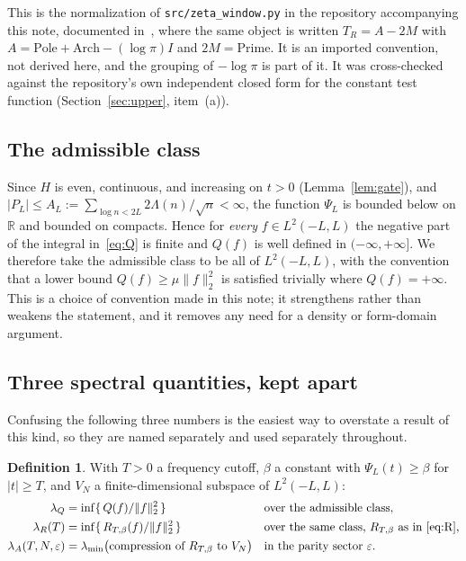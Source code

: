 \documentclass[11pt,a4paper]{article}
\theoremstyle{definition}
\newtheorem{definition}[theorem]{Definition}
\theoremstyle{remark}
\newcommand{\lQ}{\lambda_{Q}}
\newcommand{\lR}{\lambda_{R}}
\newcommand{\lA}{\lambda_{A}}
\newcommand{\PsiL}{\Psi_{L}}
\newcommand{\src}[1]{{\footnotesize\texttt{#1}}}
\begin{document}
This is the normalization of \src{src/zeta\_window.py} in the repository
accompanying this note, documented in~\cite{Sensitivity}, where the same object
is written $T_R = A - 2M$ with $A = \mathrm{Pole} + \mathrm{Arch} - (\log\pi)I$
and $2M = \mathrm{Prime}$. It is an imported convention, not derived here, and
the grouping of $-\log\pi$ is part of it. It was cross-checked against the repository's own
independent closed form for the constant test function
(Section~\ref{sec:upper}, item~(a)).

\subsection{The admissible class}

Since $H$ is even, continuous, and increasing on $t > 0$
(Lemma~\ref{lem:gate}), and $|P_L| \le A_L := \sum_{\log n < 2L}
2\Lambda(n)/\sqrt n < \infty$, the function $\PsiL$ is bounded below on
$\mathbb{R}$ and bounded on compacts. Hence for \emph{every} $f \in L^2(-L,L)$
the negative part of the integral in~\eqref{eq:Q} is finite and $Q(f)$ is
well defined in $(-\infty,+\infty]$. We therefore take the admissible class to
be all of $L^2(-L,L)$, with the convention that a lower bound
$Q(f) \ge \mu\|f\|_2^2$ is satisfied trivially where $Q(f) = +\infty$. This is a
choice of convention made in this note; it strengthens rather than weakens the
statement, and it removes any need for a density or form-domain argument.

\subsection{Three spectral quantities, kept apart}

Confusing the following three numbers is the easiest way to overstate a result
of this kind, so they are named separately and used separately throughout.

\begin{definition}
\label{def:three}
With $T > 0$ a frequency cutoff, $\beta$ a constant with $\PsiL(t) \ge \beta$
for $|t| \ge T$, and $V_N$ a finite-dimensional subspace of $L^2(-L,L)$:
\begin{align*}
  \lQ      &= \inf\{\,Q(f)/\|f\|_2^2 \,\}
             && \text{over the admissible class,}\\
  \lR(T)   &= \inf\{\,R_{T,\beta}(f)/\|f\|_2^2 \,\}
             && \text{over the same class, } R_{T,\beta} \text{ as in \eqref{eq:R},}\\
  \lA(T,N,\varepsilon) &= \lambda_{\min}\big(\text{compression of } R_{T,\beta} \text{ to } V_N\big)
             && \text{in the parity sector } \varepsilon .
\end{align*}
\end{definition}
\end{document}
